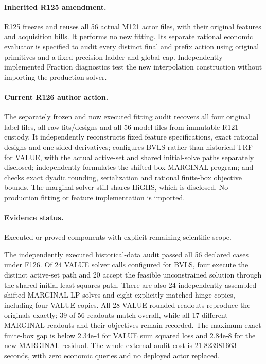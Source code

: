 \paragraph{Inherited R125 amendment.} R125 freezes and reuses all 56 actual M121 actor files, with their original features and acquisition bills. It performs no new fitting. Its separate rational economic evaluator is specified to audit every distinct final and prefix action using original primitives and a fixed precision ladder and global cap. Independently implemented Fraction diagnostics test the new interpolation construction without importing the production solver.

\paragraph{Current R126 author action.} The separately frozen and now executed fitting audit recovers all four original label files, all raw fits/designs and all 56 model files from immutable R121 custody. It independently reconstructs fixed feature specifications, exact rational designs and one-sided derivatives; configures BVLS rather than historical TRF for VALUE, with the actual active-set and shared initial-solve paths separately disclosed; independently formulates the shifted-box MARGINAL program; and checks exact dyadic rounding, serialization and rational finite-box objective bounds. The marginal solver still shares HiGHS, which is disclosed. No production fitting or feature implementation is imported.

\paragraph{Evidence status.} Executed or proved components with explicit remaining scientific scope.

The independently executed historical-data audit passed all 56 declared cases under F126. Of 24 VALUE solver calls configured for BVLS, four execute the distinct active-set path and 20 accept the feasible unconstrained solution through the shared initial least-squares path. There are also 24 independently assembled shifted MARGINAL LP solves and eight explicitly matched hinge copies, including four VALUE copies. All 28 VALUE rounded readouts reproduce the originals exactly; 39 of 56 readouts match overall, while all 17 different MARGINAL readouts and their objectives remain recorded. The maximum exact finite-box gap is below 2.34e-4 for VALUE sum squared loss and 2.84e-8 for the new MARGINAL residual. The whole external audit cost is 21.823981663 seconds, with zero economic queries and no deployed actor replaced.\par


